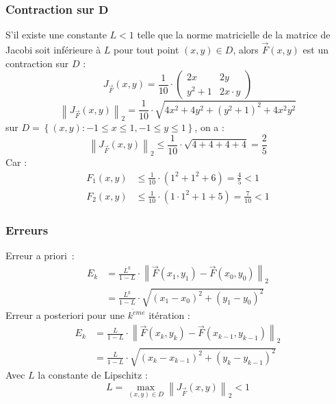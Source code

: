 \subsubsection*{Contraction sur $\mathbf{D}$}
\noindent
S'il existe une constante $L<1$ telle que la norme matricielle de la matrice de Jacobi
soit inférieure à $L$ pour tout point $(x,y)\in D$, alors $\overrightarrow{F}(x,y)$ est
un contraction sur $D$ :
\begin{equation}
    J_{\overrightarrow{F}}(x,y) =
    \frac{1}{10}\cdot
    \begin{pmatrix}
        2x    & 2y        \\
        y^2+1 & 2x\cdot y
    \end{pmatrix}
    \nonumber
\end{equation}
\begin{equation}
    \left\|J_{\overrightarrow{F}}(x,y)\right\|_2 = \frac{1}{10}\cdot\sqrt{4x^2+4y^2+(y^2+1)^2+4x^2y^2}
    \nonumber
\end{equation}
sur $D=\left\{(x,y):-1\leq x\leq 1, -1\leq y\leq 1\right\}$, on a :
\begin{equation}
    \left\|J_{\overrightarrow{F}}(x,y)\right\|_2 \leq \frac{1}{10}\cdot\sqrt{4+4+4+4} = \frac{2}{5}
    \nonumber
\end{equation}
Car :
\begin{align*}
    F_1(x,y) & \leq \frac{1}{10}\cdot(1^2+1^2+6) = \frac{4}{5} < 1      \\
    F_2(x,y) & \leq \frac{1}{10}\cdot(1\cdot1^2+1+5) = \frac{7}{10} < 1
\end{align*}
\subsubsection*{Erreurs}
\noindent
Erreur a priori :
\begin{align*}
    E_k & = \frac{L^k}{1-L}\cdot\left\|\overrightarrow{F}(x_1,y_1)-\overrightarrow{F}(x_0,y_0)\right\|_2 \\
        & = \frac{L^k}{1-L}\cdot\sqrt{(x_1-x_0)^2+(y_1-y_0)^2}
    \nonumber
\end{align*}
Erreur a posteriori pour une $k^{\grave{e}me}$ itération :
\begin{align*}
    E_k & = \frac{L}{1-L}\cdot\left\|\overrightarrow{F}(x_k,y_k)-\overrightarrow{F}(x_{k-1},y_{k-1})\right\|_2 \\
        & = \frac{L}{1-L}\cdot\sqrt{(x_k-x_{k-1})^2+(y_k-y_{k-1})^2}
    \nonumber
\end{align*}
Avec $L$ la constante de Lipschitz :
\begin{equation}
    L = \max_{(x,y)\in D}\left\|J_{\overrightarrow{F}}(x,y)\right\|_2 < 1
    \nonumber
\end{equation}
